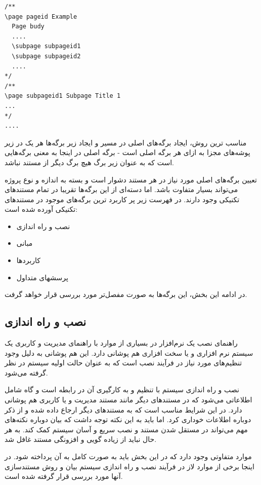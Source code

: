 \begin{latin}
\lstset{language=C++}
\begin{lstlisting}[frame=single]
/**
\page pageid Example
  Page budy
  ....
  \subpage subpageid1
  \subpage subpageid2
  ....
*/
/**
\page subpageid1 Subpage Title 1
...
*/
....
\end{lstlisting}
\end{latin}

  مناسب ترین روش، ایجاد برگه‌های اصلی در مسیر  و ایجاد زیر برگه‌ها هر یک در زیر
  پوشه‌های مجزا به ازای هر برگه اصلی است - برگه اصلی در اینجا به معنی برگه‌هایی
  است که به عنوان زیر برگ هیچ برگ دیگر از مستند نباشد.

  تعیین برگه‌های اصلی مورد نیاز در هر مستند دشوار است و بسته به اندازه و نوع
  پروژه می‌تواند بسیار متفاوت باشد. اما دسته‌ای از این برگه‌ها
  تقریبا در تمام مستندهای تکنیکی وجود دارند.
  در فهرست زیر پر کاربرد ترین برگه‌های موجود در مستندهای تکنیکی آورده شده است:
  \begin{itemize}
   \item نصب و راه اندازی
   \item مبانی
   \item کاربردها
   \item پرسشهای متداول
  \end{itemize}
  در ادامه این بخش، این برگه‌ها به صورت مفصل‌تر مورد بررسی قرار  خواهد گرفت.

  
  
\subsection{نصب و راه اندازی}
  راهنمای نصب یک نرم‌افزار در بسیاری از موارد با راهنمای مدیریت و کاربری یک
  سیستم نرم افزاری و یا سخت افزاری هم پوشانی دارد. این هم پوشانی به دلیل وجود
  تنظیم‌های مورد نیاز در فرآیند نصب است که به عنوان حالت اولیه سیستم در نظر
  گرفته می‌شود.

  نصب و راه اندازی سیستم با تنظیم و به کارگیری آن در رابطه است و
  گاه شامل اطلاعاتی می‌شود که در مستندهای دیگر مانند مستند مدیریت و یا کاربری 
  هم پوشانی دارد. در این شرایط مناسب است که به مستندهای دیگر ارجاع داده شده و از
  ذکر دوباره اطلاعات خوداری کرد. اما باید به این نکته توجه داشت که بیان دوباره
  نکته‌های مهم می‌تواند در مستقل شدن مستند و نصب سریع و آسان سیستم کمک کند. به
  هر حال نباید از زیاده گویی و افزونگی مستند غافل شد.

  موارد متفاوتی وجود دارد که در این بخش باید به صورت کامل به آن پرداخته شود. در
  اینجا برخی از موارد لاز در فرآیند نصب و راه اندازی سیستم بیان و 
روش مستندسازی آنها مورد بررسی قرار گرفته شده است.



